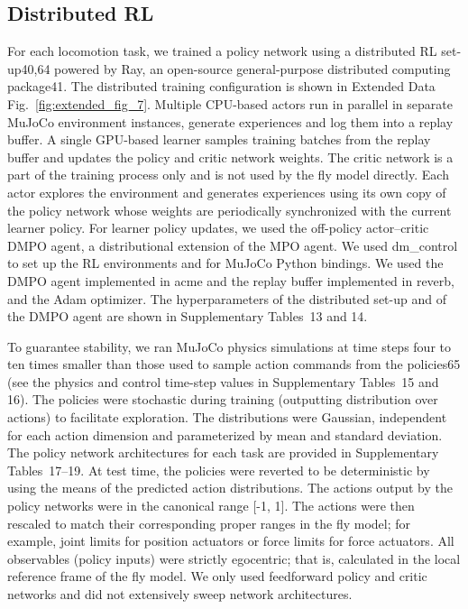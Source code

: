 \documentclass[sn-mathphys-num]{sn-jnl}%
\theoremstyle{thmstyleone}	%
\theoremstyle{thmstyletwo}	%
\theoremstyle{thmstylethree}	%
\begin{document}
\subsection{Distributed RL}


For each locomotion task, we trained a policy network using a distributed RL set-up40,64 powered by Ray, an open-source general-purpose distributed computing package41. 
The distributed training configuration is shown in Extended Data Fig.~\ref{fig:extended_fig_7}. 
Multiple CPU-based actors run in parallel in separate MuJoCo environment instances, generate experiences and log them into a replay buffer. 
A single GPU-based learner samples training batches from the replay buffer and updates the policy and critic network weights. 
The critic network is a part of the training process only and is not used by the fly model directly. 
Each actor explores the environment and generates experiences using its own copy of the policy network whose weights are periodically synchronized with the current learner policy. 
For learner policy updates, we used the off-policy actor–critic DMPO agent, a distributional extension\cite{bellemare2017distributional} of the MPO agent\cite{abdolmaleki2018relative,abdolmaleki2018maximum}. 
We used dm\_control\cite{tunyasuvunakool2020dm_control} to set up the RL environments and for MuJoCo Python bindings. 
We used the DMPO agent implemented in acme\cite{hoffman2020acme} and the replay buffer implemented in reverb\cite{cassirer2021reverb}, and the Adam optimizer\cite{kingma2014adam}. 
The hyperparameters of the distributed set-up and of the DMPO agent are shown in Supplementary Tables 13 and 14.


To guarantee stability, we ran MuJoCo physics simulations at time steps four to ten times smaller than those used to sample action commands from the policies65 (see the physics and control time-step values in Supplementary Tables 15 and 16). 
The policies were stochastic during training (outputting distribution over actions) to facilitate exploration. 
The distributions were Gaussian, independent for each action dimension and parameterized by mean and standard deviation. 
The policy network architectures for each task are provided in Supplementary Tables 17–19. 
At test time, the policies were reverted to be deterministic by using the means of the predicted action distributions. 
The actions output by the policy networks were in the canonical range [-1, 1].
The actions were then rescaled to match their corresponding proper ranges in the fly model; 
for example, joint limits for position actuators or force limits for force actuators. 
All observables (policy inputs) were strictly egocentric; 
that is, calculated in the local reference frame of the fly model. 
We only used feedforward policy and critic networks and did not extensively sweep network architectures.
\end{document}
